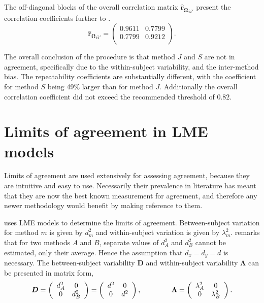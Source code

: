 \documentclass[12pt, a4paper]{report}
\theoremstyle{plain}
\theoremstyle{definition}
\theoremstyle{remark}
\begin{document}
The off-diagonal blocks of the overall correlation matrix $\boldsymbol{\hat{r}_{\Omega}}_{ii'}$ present the correlation coefficients further to \citet{hamlett}.
\[
\boldsymbol{\hat{r}_{\Omega}}_{ii'} = \left( \begin{array}{cc}
    0.9611  & 0.7799  \\
    0.7799  & 0.9212  \\
    \end{array}\right).
\]

The overall conclusion of the procedure is that method $J$ and $S$ are not in agreement, specifically due to the within-subject variability, and the inter-method bias. The repeatability coefficients are substantially different, with the coefficient for method $S$ being 49\% larger than for method $J$. Additionally the overall correlation coefficient did not exceed the recommended threshold of $0.82$.


\newpage
\section{Limits of agreement in LME models}

Limits of agreement are used extensively for assessing agreement, because they are intuitive and easy to use.
Necessarily their prevalence in literature has meant that they are now the best known measurement for agreement, and therefore any newer methodology would benefit by making reference to them.

\citet{BXC2008} uses LME models to determine the limits of agreement. Between-subject variation for method $m$ is given by $d^2_{m}$ and within-subject variation is given by $\lambda^2_{m}$.  \citet{BXC2008} remarks that for two methods $A$ and $B$, separate values of $d^2_{A}$ and $d^2_{B}$ cannot be estimated, only their average. Hence the assumption that $d_{x}= d_{y}= d$ is necessary. The between-subject variability $\boldsymbol{D}$ and within-subject variability $\boldsymbol{\Lambda}$ can be presented in matrix form,\[
\boldsymbol{D} = \left(%
\begin{array}{cc}
   d^2_{A}& 0 \\
  0 & d^2_{B} \\
\end{array}%
\right)=\left(%
\begin{array}{cc}
   d^2& 0 \\
  0 & d^2\\
\end{array}%
\right),
\hspace{1.5cm}
\boldsymbol{\Lambda} = \left(%
\begin{array}{cc}
   \lambda^2_{A}& 0 \\
  0 & \lambda^2_{B} \\
\end{array}%
\right).
\]
\end{document}
